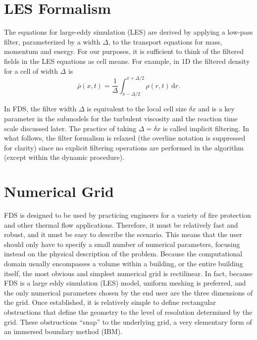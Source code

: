 \section{LES Formalism}
\label{filteredfields}

The equations for large-eddy simulation (LES) are derived by applying a low-pass filter, parameterized by a width $\Delta$, to the transport equations for mass, momentum and energy.  For our purposes, it is sufficient to think of the filtered fields in the LES equations as cell means.  For example, in 1D the filtered density for a cell of width $\Delta$ is
\begin{equation}
\label{eqn_filtered_density}
\bar{\rho}(x,t) = \frac{1}{\Delta}\int_{x-\Delta/2}^{x+\Delta/2} \rho(r,t) \,\mbox{d}r \mbox{.}
\end{equation}

In FDS, the filter width $\Delta$ is equivalent to the local cell size $\delta x$ and is a key parameter in the submodels for the turbulent viscosity and the reaction time scale discussed later.  The practice of taking $\Delta = \delta x$ is called implicit filtering.  In what follows, the filter formalism is relaxed (the overline notation is suppressed for clarity) since no explicit filtering operations are performed in the algorithm (except within the dynamic procedure).

\section{Numerical Grid}
\label{govequations}

FDS is designed to be used by practicing engineers for a variety of fire protection and other thermal flow applications.
Therefore, it must be relatively fast and robust, and it must be easy to describe the scenario. This means that the user
should only have to specify a small number of numerical parameters, focusing instead on the physical description of the
problem. Because the
computational domain usually encompasses a volume within a building, or the entire building itself, the
most obvious and simplest numerical grid is rectilinear.
In fact, because FDS is a large eddy simulation (LES) model, uniform meshing is
preferred, and the only numerical parameters chosen by the end user are the three dimensions of the grid. Once established, it
is relatively simple to define rectangular obstructions that define the geometry to the level of resolution determined by the
grid. These obstructions ``snap'' to the underlying grid, a very elementary form of an immersed boundary method (IBM).

